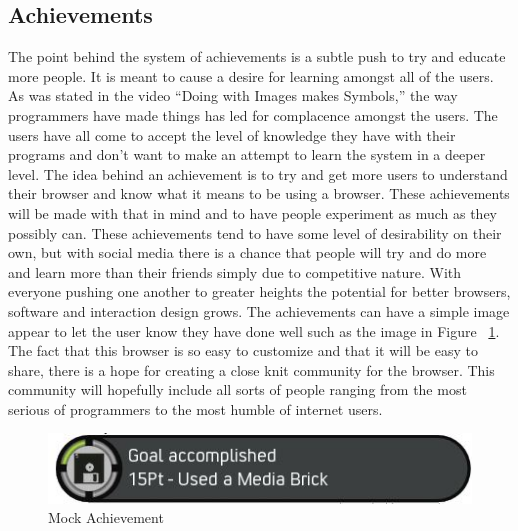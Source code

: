 \documentclass[11pt]{article}
\begin{document}
\subsection{Achievements}
The point behind the system of achievements is a subtle push to try and educate more people. It is meant to cause a desire for learning amongst all of the users. As was stated in the video “Doing with Images makes Symbols,” the way programmers have made things has led for complacence amongst the users. The users have all come to accept the level of knowledge they have with their programs and don’t want to make an attempt to learn the system in a deeper level. The idea behind an achievement is to try and get more users to understand their browser and know what it means to be using a browser. These achievements will be made with that in mind and to have people experiment as much as they possibly can. These achievements tend to have some level of desirability on their own, but with social media there is a chance that people will try and do more and learn more than their friends simply due to competitive nature. With everyone pushing one another to greater heights the potential for better browsers, software and interaction design grows. The achievements can have a simple image appear to let the user know they have done well such as the image in Figure  ~\ref{Achieve}. The fact that this browser is so easy to customize and that it will be easy to share, there is a hope for creating a close knit community for the browser. This community will hopefully include all sorts of people ranging from the most serious of programmers to the most humble of internet users.

\begin{figure}[h!]
 \centering
    \includegraphics[width= 1\textwidth]{./Images/achievement}
  \caption{Mock Achievement}
 \label{Achieve}
\end{figure}
\end{document}
